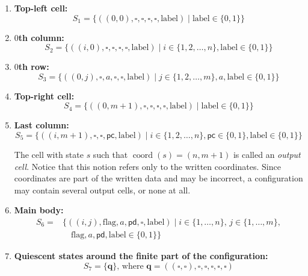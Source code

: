 \documentclass{article}
\theoremstyle{plain}
\theoremstyle{definition}
\DeclareMathOperator{\coord}{coord}
\newcommand{\tuple}{\mathbf}
\begin{document}
\begin{enumerate}
    \item \textbf{Top-left cell:} 
    \[
    S_1 = \{ ((0,0),  \square, \square, \square, \square, \mathrm{label}) \mid \mathrm{label} \in \{0, 1\} \}
    \]
    
    \item \textbf{$0$th column:} 
    \[
    S_2 = \{ ((i,0),\square, \square, \square, \square, \mathrm{label}) \mid i \in \{1, 2, \dots, n \}, \mathrm{label} \in \{0, 1\}\}
    \]
    
    \item \textbf{$0$th row:} 
    \[
    S_3 = \{ ((0, j), \square, a, \square, \square, \mathrm{label}) \mid j \in \{1, 2, \dots, m \}, a, \mathrm{label} \in \{0, 1\} \}
    \]

    \item \textbf{Top-right cell:} 
    \[
   S_4 = \{  ((0, m+1), \square, \square, \square, \square, \mathrm{label}) \mid \mathrm{label} \in \{0, 1\} \}
    \]
    

    
    \item  \textbf{Last column:} 
    \[
   S_5 = \{  ((i, m+1), \square, \square, \mathsf{pc}, \mathrm{label}) \mid i \in \{1, 2, \dots, n\},\mathsf{pc} \in \{0, 1\}, \mathrm{label} \in \{0, 1\} \}
    \]

    The cell with state $s$ such that $\coord(s)=(n,m+1)$ is called an \emph{output cell}. Notice that this notion refers only to the written coordinates. Since coordinates are part of the written data and may be incorrect,
a configuration may contain several output cells, or none at all.
    
    \item \textbf{Main body:} 
   \[
\begin{aligned}
S_6 = {} & \{ ((i, j), \mathrm{flag}, a, \mathsf{pd}, \square, \mathrm{label}) 
   \mid i \in \{1, \dots, n\},\, j \in \{1, \dots, m\}, \\
   & \quad \mathrm{flag}, a, \mathsf{pd}, \mathrm{label} \in \{0, 1\} \} %
\end{aligned}
\]


    \item \textbf{Quiescent states around the finite part of the configuration:}
    \[
    S_7 = \{\tuple q \} \text{, where } \tuple q = ( (\square, \square), \square, \square, \square, \square, \square)
    \]
    


\end{enumerate}
\end{document}
